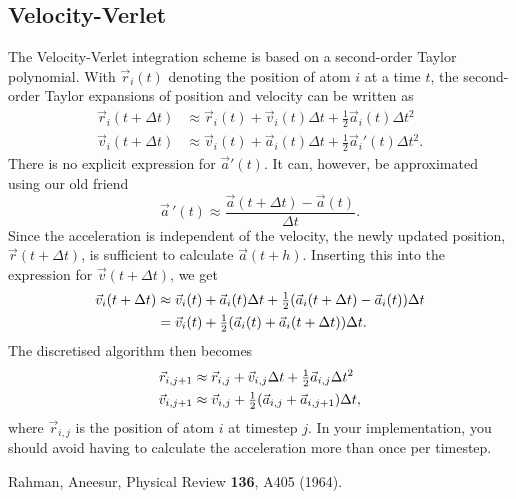 \documentclass[11pt,english,a4paper]{report}
\begin{document}
\subsection{Velocity-Verlet}\label{app:verlet}
The Velocity-Verlet integration scheme is based on a second-order Taylor polynomial. With \(\vec{r}_i(t)\) denoting the position of atom \(i\) at a time \(t\), the second-order Taylor expansions of position and velocity can be written as
\begin{alignat*}{2}
    \vec{r}_i(t+\Delta t) &\approx \vec{r}_i(t) + \vec{v}_i(t)\Delta t + \tfrac{1}{2}\vec{a}_i(t)\Delta t^2\\
    \vec{v}_i(t+\Delta t) &\approx \vec{v}_i(t) + \vec{a}_i(t)\Delta t + \tfrac{1}{2}\vec{a}_i'(t)\Delta t^2.
\end{alignat*}
There is no explicit expression for \(\vec{a}'(t)\). It can, however, be approximated using our old friend
\[
\vec{a}\,'(t)\approx\frac{\vec{a}(t+\Delta t)-\vec{a}(t)}{\Delta t}.
\]
Since the acceleration is independent of the velocity, the newly updated position, \(\vec{r}(t+\Delta t)\), is sufficient to calculate \(\vec{a}(t+h)\). Inserting this into the expression for \(\vec{v}(t+\Delta t)\), we get
\begin{alignat*}{2}
    \vec{v}_i(t+\Delta t) &\approx \vec{v}_i(t) + \vec{a}_i(t)\Delta t + \tfrac{1}{2}\qty(\vec{a}_i(t+\Delta t)-\vec{a}_i(t))\Delta t\\
    &= \vec{v}_i(t) + \tfrac{1}{2}\qty(\vec{a}_i(t)+\vec{a}_i(t+\Delta t))\Delta t.
\end{alignat*}
The discretised algorithm then becomes
\begin{alignat*}{2}
    \vec{r}_{i,j+1} &\approx \vec{r}_{i,j} + \vec{v}_{i,j}\Delta t + \tfrac{1}{2}\vec{a}_{i,j}\Delta t^2\\
    \vec{v}_{i,j+1} &\approx \vec{v}_{i,j} + \tfrac{1}{2}\qty(\vec{a}_{i,j} + \vec{a}_{i,j+1})\Delta t,
\end{alignat*}
where \(\vec{r}_{i,j}\) is the position of atom \(i\) at timestep \(j\). In your implementation, you should avoid having to calculate the acceleration more than once per timestep.


\begin{thebibliography}{99}
 Rahman, Aneesur, Physical Review {\bf 136}, A405 (1964).

\end{thebibliography}
\end{document}
